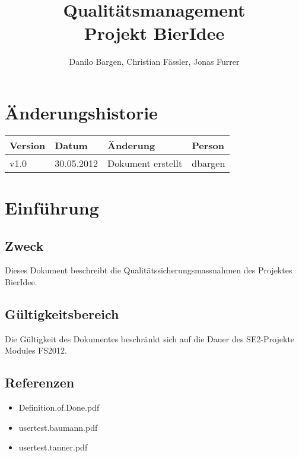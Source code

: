 \documentclass[10pt,a4paper]{scrartcl}
\author{Danilo Bargen, Christian Fässler, Jonas Furrer}
\title{Qualitätsmanagement\\ Projekt BierIdee}
\begin{document}
\begin{titlepage}
	\maketitle
	\vspace{120mm}
	\thispagestyle{empty} %
\end{titlepage}

\tableofcontents
\newpage

\section*{Änderungshistorie}
\begin{tabular}{p{}p{}p{}p{}}
\toprule
\textbf{Version} & \textbf{Datum} & \textbf{Änderung} & \textbf{Person} \\  
\midrule
v1.0 & 30.05.2012 & Dokument erstellt & dbargen \\  
\bottomrule
\end{tabular} 
\newpage


\section{Einführung}

\subsection{Zweck}
Dieses Dokument beschreibt die Qualitätssicherungsmassnahmen des Projektes BierIdee.

\subsection{Gültigkeitsbereich}
Die Gültigkeit des Dokumentes beschränkt sich auf die Dauer des SE2-Projekte Modules FS2012.

\subsection{Referenzen}

\begin{itemize}
	\item Definition.of.Done.pdf
	\item usertest.baumann.pdf
	\item usertest.tanner.pdf
\end{itemize}
\end{document}
